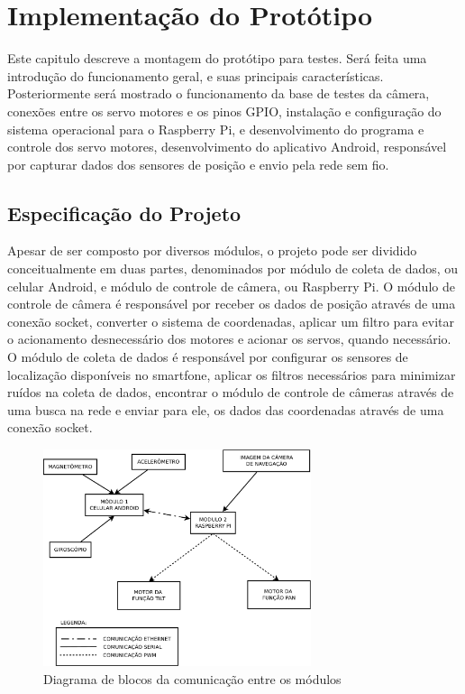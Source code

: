 
\chapter{Implementação do Protótipo}
\label{chap:prototipo}

Este capitulo descreve a montagem do protótipo para testes. Será feita uma introdução do funcionamento geral, e suas principais características. Posteriormente será mostrado o funcionamento da base de testes da câmera, conexões entre os servo motores e os pinos GPIO, instalação e configuração do sistema operacional para o Raspberry Pi, e desenvolvimento do programa e controle dos servo motores, desenvolvimento do aplicativo Android, responsável por capturar dados dos sensores de posição e envio pela rede sem fio.

\section{Especificação do Projeto}
\label{sec:especificacao}

Apesar de ser composto por diversos módulos, o projeto pode ser dividido conceitualmente em duas partes, denominados por módulo de coleta de dados, ou celular Android, e módulo de controle de câmera, ou Raspberry Pi. O módulo de controle de câmera é responsável por receber os dados de posição através de uma conexão socket, converter o sistema de coordenadas, aplicar um filtro para evitar o acionamento desnecessário dos motores e acionar os servos, quando necessário. O módulo de coleta de dados é responsável por configurar os sensores de localização disponíveis no smartfone, aplicar os filtros necessários para minimizar ruídos na coleta de dados, encontrar o módulo de controle de câmeras através de uma busca na rede e enviar para ele, os dados das coordenadas através de uma conexão socket. \par

\begin{figure}[H]
	\centering
	\includegraphics[width=0.7\textwidth]{figuras/diagrama-modulos-eps-converted-to.pdf}
	\caption{Diagrama de blocos da comunicação entre os módulos}
	\label{fig:diagrama_blocos}
\end{figure}


